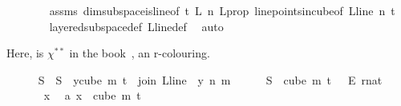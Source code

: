 \begin{isabellebody}
\ \ \ \ \ \ \isamarkupfalse%
\ assms{\isacharparenleft}{\kern0pt}{}{\isacharparenright}{\kern0pt}\ dim{}{\isacharunderscore}{\kern0pt}subspace{\isacharunderscore}{\kern0pt}is{\isacharunderscore}{\kern0pt}line{\isacharbrackleft}{\kern0pt}of\ {\isachardoublequoteopen}t{\isacharplus}{\kern0pt}{}{\isachardoublequoteclose}\ {\isachardoublequoteopen}L{\isachardoublequoteclose}\ {\isachardoublequoteopen}n{\isachardoublequoteclose}{\isacharbrackright}{\kern0pt}\ L{\isacharunderscore}{\kern0pt}prop\ line{\isacharunderscore}{\kern0pt}points{\isacharunderscore}{\kern0pt}in{\isacharunderscore}{\kern0pt}cube{\isacharbrackleft}{\kern0pt}of\ L{\isacharunderscore}{\kern0pt}line\ n\ {\isachardoublequoteopen}t{\isacharplus}{\kern0pt}{}{\isachardoublequoteclose}{\isacharbrackright}{\kern0pt}\ \isanewline
\ \ \ \ \ \ \isamarkupfalse%
\ layered{\isacharunderscore}{\kern0pt}subspace{\isacharunderscore}{\kern0pt}def\ L{\isacharunderscore}{\kern0pt}line{\isacharunderscore}{\kern0pt}def\ \isamarkupfalse%
\ auto%
\begin{isamarkuptext}%
Here,  is $\chi^{**}$ in the book~\cite{thebook}, an r-colouring.%
\end{isamarkuptext}\isamarkuptrue%
\ \ \ \ \isamarkupfalse%
\ {\isasymchi}S\ \ {\isachardoublequoteopen}{\isasymchi}S\ {\isasymequiv}\ {\isacharparenleft}{\kern0pt}{\isasymlambda}y{\isasymin}cube\ m\ {\isacharparenleft}{\kern0pt}t{\isacharplus}{\kern0pt}{}{\isacharparenright}{\kern0pt}{\isachardot}{\kern0pt}\ {\isasymchi}\ {\isacharparenleft}{\kern0pt}join\ {\isacharparenleft}{\kern0pt}L{\isacharunderscore}{\kern0pt}line\ {}{\isacharparenright}{\kern0pt}\ y\ n\ m{\isacharparenright}{\kern0pt}{\isacharparenright}{\kern0pt}{\isachardoublequoteclose}\isanewline
\ \ \ \ \isamarkupfalse%
\ {\isachardoublequoteopen}{\isasymchi}S\ {\isasymin}\ {\isacharparenleft}{\kern0pt}cube\ m\ {\isacharparenleft}{\kern0pt}t\ {\isacharplus}{\kern0pt}\ {}{\isacharparenright}{\kern0pt}{\isacharparenright}{\kern0pt}\ {\isasymrightarrow}\isactrlsub E\ {\isacharbraceleft}{\kern0pt}{\isachardot}{\kern0pt}{\isachardot}{\kern0pt}{\isacharless}{\kern0pt}r{\isacharcolon}{\kern0pt}{\isacharcolon}{\kern0pt}nat{\isacharbraceright}{\kern0pt}{\isachardoublequoteclose}\isanewline
\ \ \ \ \isamarkupfalse%
\isanewline
\ \ \ \ \ \isamarkupfalse%
\ x\ \isamarkupfalse%
\ a{\isacharcolon}{\kern0pt}\ {\isachardoublequoteopen}x\ {\isasymin}\ cube\ m\ {\isacharparenleft}{\kern0pt}t{\isacharplus}{\kern0pt}{}{\isacharparenright}{\kern0pt}{\isachardoublequoteclose}\isanewline

\end{isabellebody}
